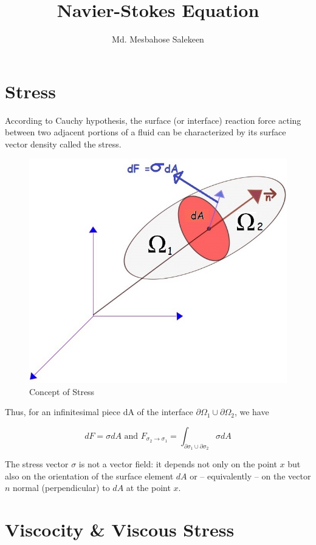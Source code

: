 \documentclass{article}
\title{Navier-Stokes Equation}
\author{Md. Mesbahose Salekeen}
\date{}
\begin{document}
\maketitle
\large

\section*{Stress}

According to Cauchy hypothesis, the surface (or interface) reaction force acting between
two adjacent portions of a fluid can be characterized by its surface vector density called the
stress.

\begin{figure}[h!]
\centering
\includegraphics[scale=.4]{Stress.jpg}
\caption{Concept of Stress}
\label{fig:Stress}
\end{figure}

Thus, for an infinitesimal piece dA of the interface $\partial \Omega_{1} \cup \partial \Omega_{2}$, we have

$$dF = \sigma dA \text{ and } F_{\sigma_{2}\to\sigma_{1}} = \int_{\partial \sigma_{1}\cup \partial \sigma_{2}}\sigma dA$$

The stress vector $\sigma$ is not a vector field: it depends not only on the point $x$ but also on the orientation of the surface element $dA$ or – equivalently – on the vector $n$ normal (perpendicular) to $dA$ at the point $x$.

\section*{Viscocity \& Viscous Stress}
\end{document}
